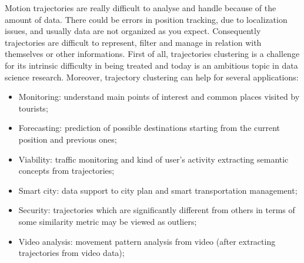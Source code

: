 Motion trajectories are really difficult to analyse and handle because of the amount of data. There could be errors in position tracking, due to localization issues, and usually data are not organized as you expect. Consequently trajectories are difficult to represent, filter and manage in relation with themselves or other informations. First of all, trajectories clustering is a challenge for its intrinsic difficulty in being treated and today is an ambitious topic in data science research. Moreover, trajectory clustering can help for several applications:
\begin{itemize}
	\item Monitoring: understand main points of interest and common places visited by tourists;
	\item Forecasting: prediction of possible destinations starting from the current position and previous ones; 
	\item Viability: traffic monitoring and kind of user's activity extracting semantic concepts from trajectories;
	\item Smart city: data support to city plan and smart transportation management;
	\item Security: trajectories which are significantly different from others in terms of some similarity metric may be viewed as outliers;
	\item Video analysis: movement pattern analysis from video (after extracting trajectories from video data);
\end{itemize}

